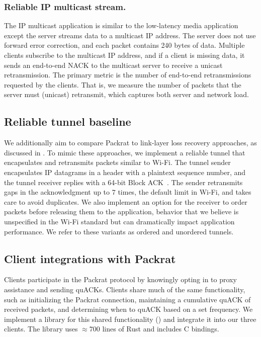 \subsubsection{Reliable IP multicast stream.}

The IP multicast application is similar to the low-latency media application
except the server streams data to a multicast IP address. The server does not
use forward error correction, and each packet contains 240 bytes of data. Multiple clients
subscribe to the multicast IP address, and if a client is missing data,
it sends an end-to-end NACK to the
multicast server to receive a unicast retransmission.
The primary metric is the number of end-to-end retransmissions requested by
the clients. That is, we measure the number of packets that the server
must (unicast) retransmit, which captures both server and network load.

\subsection{Reliable tunnel baseline}
\label{sec:packrat:implementation:tunnel}

We additionally aim to compare Packrat to link-layer loss recovery approaches,
as discussed in . To mimic these approaches, we
implement a reliable tunnel that encapsulates and retransmits packets similar
to Wi-Fi. The tunnel sender encapsulates IP datagrams in a header with a
plaintext sequence number, and the tunnel receiver replies with a 64-bit Block
ACK~\cite{ieee80211e}. The sender retransmits gaps in the acknowledgment up to
$7$ times, the default limit in Wi-Fi, and takes care to avoid duplicates. We
also implement an option for the receiver to order packets before releasing
them to the application, behavior that we believe is unspecified in the Wi-Fi
standard but can dramatically impact application performance. We refer to these
variants as ordered and unordered tunnels.

\subsection{Client integrations with Packrat}
\label{sec:packrat:implementation:client-integrations}



Clients participate in the Packrat protocol by knowingly opting in to proxy
assistance and sending quACKs. Clients share much of the same functionality,
such as initializing the Packrat connection, maintaining a cumulative quACK of
received packets, and determining when to quACK based on a set frequency. We
implement a library for this shared functionality ()
and integrate it into our three clients.
The library uses $\approx\!700$ lines of Rust and includes C bindings.

